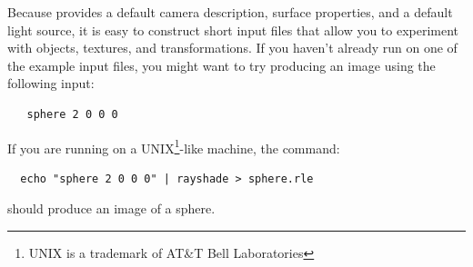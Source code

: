 Because \rayshade provides a default camera description, surface properties,
and a default light
source, it is easy to construct short input files that allow you to
experiment with objects, textures, and transformations.
If you haven't already run \rayshade on one of the example input files,
you might want to try producing an image using the following input:

\begin{verbatim}
   sphere 2 0 0 0
\end{verbatim}

If you are running \rayshade on a UNIX\footnote{UNIX is a trademark
of AT\&T Bell Laboratories}-like machine, the command:
\begin{verbatim}
  echo "sphere 2 0 0 0" | rayshade > sphere.rle
\end{verbatim}
should produce an image of a sphere.
